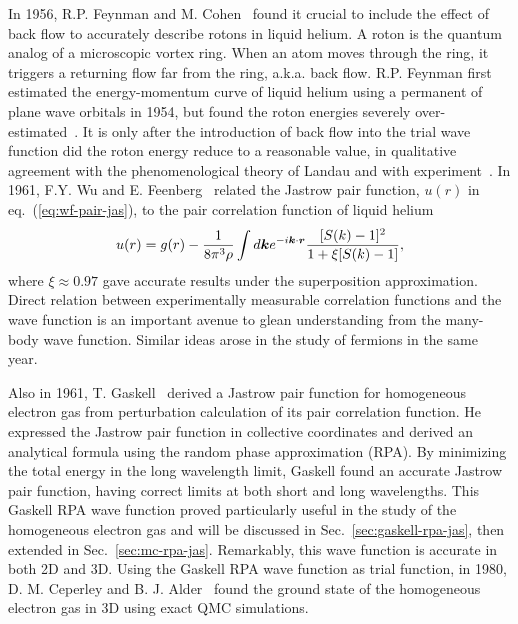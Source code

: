 In 1956, R.P. Feynman and M. Cohen~\cite{Feynman1956} found it crucial to include the effect of back flow to accurately describe rotons in liquid helium. A roton is the quantum analog of a microscopic vortex ring. When an atom moves through the ring, it triggers a returning flow far from the ring, a.k.a. back flow. R.P. Feynman first estimated the energy-momentum curve of liquid helium using a permanent of plane wave orbitals in 1954, but found the roton energies severely over-estimated~\cite{Feynman1954}. It is only after the introduction of back flow into the trial wave function did the roton energy reduce to a reasonable value, in qualitative agreement with the phenomenological theory of Landau and with experiment~\cite{Feynman1956}.
In 1961, F.Y. Wu and E. Feenberg~\cite{Wu1961} related the Jastrow pair function, $u(r)$ in eq.~(\ref{eq:wf-pair-jas}), to the pair correlation function of liquid helium
\begin{align}
u(r) = g(r) - \dfrac{1}{8\pi^3\rho}\int d\boldsymbol{k} e^{-i\boldsymbol{k}\cdot\boldsymbol{r}}
\dfrac{[S(k)-1]^2}{1+\xi[S(k)-1]},
\end{align}
where $\xi\approx0.97$ gave accurate results under the superposition approximation.
Direct relation between experimentally measurable correlation functions and the wave function is an important avenue to glean understanding from the many-body wave function.
Similar ideas arose in the study of fermions in the same year.

Also in 1961, T. Gaskell~\cite{Gaskell1961} derived a Jastrow pair function for homogeneous electron gas from perturbation calculation of its pair correlation function. He expressed the Jastrow pair function in collective coordinates and derived an analytical formula using the random phase approximation (RPA). By minimizing the total energy in the long wavelength limit, Gaskell found an accurate Jastrow pair function, having correct limits at both short and long wavelengths.
This Gaskell RPA wave function proved particularly useful in the study of the homogeneous electron gas and will be discussed in Sec.~\ref{sec:gaskell-rpa-jas}, then extended in Sec.~\ref{sec:mc-rpa-jas}.
Remarkably, this wave function is accurate in both 2D and 3D.
Using the Gaskell RPA wave function as trial function, in 1980, D. M. Ceperley and B. J. Alder~\cite{Ceperley1980} found the ground state of the homogeneous electron gas in 3D using exact QMC simulations.

